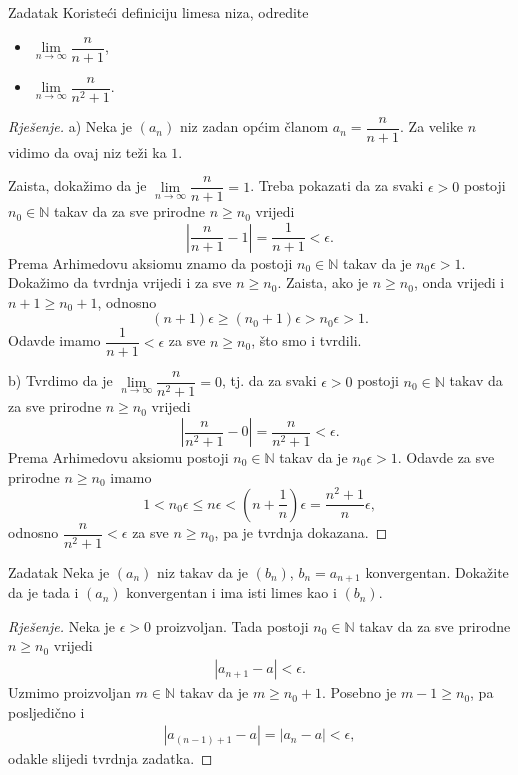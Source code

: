 \begin{exercise}{Zadatak}
Koristeći definiciju limesa niza, odredite
\begin{itemize}
\item[a)] \(\lim\limits_{n\to \infty}{\dfrac{n}{n+1}}\),
\item[b)] \(\lim\limits_{n\to \infty}{\dfrac{n}{n^2+1}}\).
\end{itemize}
\end{exercise}
\begin{proof}[Rješenje]
a) Neka je \((a_n)\) niz zadan općim članom \(a_n=\dfrac{n}{n+1}\). Za velike \(n\) vidimo da ovaj niz teži ka \(1\). 

Zaista, dokažimo da je \(\lim\limits_{n\to \infty}{\dfrac{n}{n+1}}=1\). Treba pokazati da za svaki \(\epsilon>0\) postoji \(n_0\in \mathbb{N}\) takav da za sve prirodne \(n\geq n_0\) vrijedi
\[\left\lvert\dfrac{n}{n+1}-1\right\rvert=\dfrac{1}{n+1}<\epsilon.\] Prema Arhimedovu aksiomu znamo da postoji \(n_0\in \mathbb{N}\) takav da je \(n_0\epsilon>1\). Dokažimo da tvrdnja vrijedi i za sve \(n\geq n_0\). Zaista, ako je \(n\geq n_0\), onda vrijedi i \(n+1\geq n_0+1\), odnosno \[(n+1)\epsilon\geq(n_0+1)\epsilon>n_0\epsilon>1.\] 
Odavde imamo \(\dfrac{1}{n+1}<\epsilon\) za sve \(n\geq n_0\), što smo i tvrdili.

b) Tvrdimo da je \(\lim\limits_{n\to \infty}{\dfrac{n}{n^2+1}}=0\), tj. da za svaki \(\epsilon>0\) postoji \(n_0\in \mathbb{N}\) takav da za sve prirodne \(n\geq n_0\) vrijedi
\[\left\lvert \dfrac{n}{n^2+1}-0\right\rvert=\dfrac{n}{n^2+1}<\epsilon.\]
Prema Arhimedovu aksiomu postoji \(n_0\in \mathbb{N}\) takav da je \(n_0\epsilon>1\). Odavde za sve prirodne \(n\geq n_0\) imamo
\[1<n_0\epsilon\leq n\epsilon<\left(n+\dfrac{1}{n}\right)\epsilon=\dfrac{n^2+1}{n}\epsilon,\]
odnosno \(\dfrac{n}{n^2+1}<\epsilon\) za sve \(n\geq n_0\), pa je tvrdnja dokazana.
\end{proof}
\begin{exercise}{Zadatak}
\label{41}
Neka je \((a_n)\) niz takav da je \((b_n)\), \(b_n=a_{n+1}\) konvergentan. Dokažite da je tada i \((a_n)\) konvergentan i ima isti limes kao i \((b_n)\).
\end{exercise}
\begin{proof}[Rješenje]
Neka je \(\epsilon>0\) proizvoljan. Tada postoji \(n_0\in \mathbb{N}\) takav da za sve prirodne \(n\geq n_0\) vrijedi
\begin{gather}
\label{anplus1}
|a_{n+1}-a|<\epsilon.
\end{gather}
Uzmimo proizvoljan \(m\in \mathbb{N}\) takav da je \(m\geq n_0+1\). Posebno je \(m-1\geq n_0\), pa posljedično i
\begin{gather}
\label{40}
|a_{(n-1)+1}-a|=|a_n-a|<\epsilon,
\end{gather}
odakle slijedi tvrdnja zadatka.
\end{proof}
